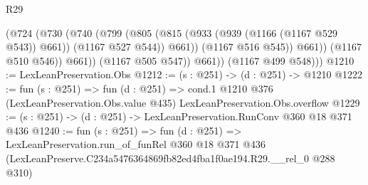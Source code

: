 \begin{lexlean}{R29}
\begin{coremodule}
                    (@724
                      (@730
                        (@740
                          (@799
                            (@805
                              (@815 (@933 (@939 (@1166 (@1167 @529 @543)) @661)) (@1167 @527 @544))
                              @661))
                          (@1167 @516 @545))
                        @661))
                    (@1167 @510 @546))
                  @661))
              (@1167 @505 @547))
            @661))
        (@1167 @499 @548)))
@1210 := LexLeanPreservation.Obs
@1212 := (s : @251) -> (d : @251) -> @1210
@1222 := fun (s : @251) =>
  fun (d : @251) =>
  cond.{1} @1210 @376 (LexLeanPreservation.Obs.value @435) LexLeanPreservation.Obs.overflow
@1229 := (s : @251) -> (d : @251) -> LexLeanPreservation.RunConv @360 @18 @371 @436
@1240 := fun (s : @251) =>
  fun (d : @251) =>
  LexLeanPreservation.run_of_funRel
    @360
    @18
    @371
    @436
    (LexLeanPreserve.C234a5476364869fb82ed4fba1f0ae194.R29.__rel_0 @288 @310)
\end{coremodule}
\end{lexlean}
